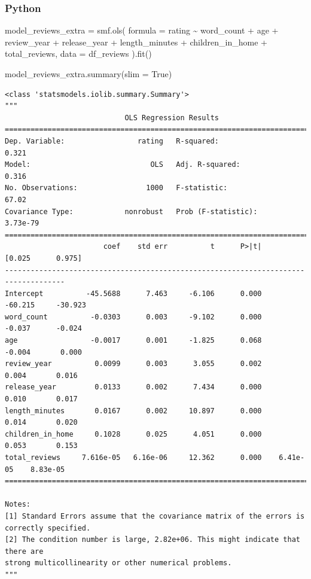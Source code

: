 \documentclass[
  letterpaper,
]{krantz}
\newenvironment{Shaded}{}{}
\newcommand{\NormalTok}[1]{#1}
\newcommand{\OperatorTok}[1]{\textcolor[rgb]{0.40,0.40,0.40}{#1}}
\newcommand{\StringTok}[1]{\textcolor[rgb]{0.25,0.44,0.63}{#1}}
\newcommand{\VariableTok}[1]{\textcolor[rgb]{0.10,0.09,0.49}{#1}}
\begin{document}
\subsubsection{Python}

\begin{Shaded}
\begin{Highlighting}[]
\NormalTok{model\_reviews\_extra }\OperatorTok{=}\NormalTok{ smf.ols(}
\NormalTok{    formula }\OperatorTok{=} \StringTok{\textquotesingle{}rating \textasciitilde{} word\_count + age + review\_year + release\_year + length\_minutes + children\_in\_home + total\_reviews\textquotesingle{}}\NormalTok{,}
\NormalTok{    data }\OperatorTok{=}\NormalTok{ df\_reviews}
\NormalTok{).fit()}

\NormalTok{model\_reviews\_extra.summary(slim }\OperatorTok{=} \VariableTok{True}\NormalTok{)}
\end{Highlighting}
\end{Shaded}

\begin{verbatim}
<class 'statsmodels.iolib.summary.Summary'>
"""
                            OLS Regression Results                            
==============================================================================
Dep. Variable:                 rating   R-squared:                       0.321
Model:                            OLS   Adj. R-squared:                  0.316
No. Observations:                1000   F-statistic:                     67.02
Covariance Type:            nonrobust   Prob (F-statistic):           3.73e-79
====================================================================================
                       coef    std err          t      P>|t|      [0.025      0.975]
------------------------------------------------------------------------------------
Intercept          -45.5688      7.463     -6.106      0.000     -60.215     -30.923
word_count          -0.0303      0.003     -9.102      0.000      -0.037      -0.024
age                 -0.0017      0.001     -1.825      0.068      -0.004       0.000
review_year          0.0099      0.003      3.055      0.002       0.004       0.016
release_year         0.0133      0.002      7.434      0.000       0.010       0.017
length_minutes       0.0167      0.002     10.897      0.000       0.014       0.020
children_in_home     0.1028      0.025      4.051      0.000       0.053       0.153
total_reviews     7.616e-05   6.16e-06     12.362      0.000    6.41e-05    8.83e-05
====================================================================================

Notes:
[1] Standard Errors assume that the covariance matrix of the errors is correctly specified.
[2] The condition number is large, 2.82e+06. This might indicate that there are
strong multicollinearity or other numerical problems.
"""
\end{verbatim}
\end{document}
